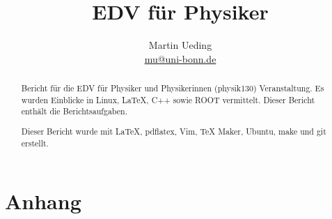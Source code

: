 \documentclass[12pt]{report}
\title{EDV für Physiker}
\author{Martin Ueding \\ \href{mailto:mu@uni-bonn.de}{mu@uni-bonn.de}}
\newcommand\gqq[1]{\glqq #1\grqq}
\begin{document}
\maketitle

\begin{abstract}
Bericht für die \gqq{EDV für Physiker und Physikerinnen} (physik130) Veranstaltung. Es wurden Einblicke in Linux, \LaTeX, C++ sowie ROOT vermittelt. Dieser Bericht enthält die Berichtsaufgaben.

Dieser Bericht wurde mit \LaTeX, pdflatex, Vim, TeX Maker, Ubuntu, make und git erstellt.
\end{abstract}

\newpage

\tableofcontents
\newpage








\part{Anhang}

\lstlistoflistings
\end{document}
